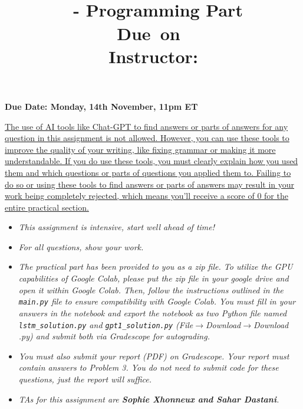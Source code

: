\documentclass[12pt]{article}
\title{
    \vspace{0in}
    \textmd{\textbf{\hmwkClass}}\\
    \hmwkTitle \ - Programming Part\\
    \normalsize\vspace{0.1in}\small{Due\ on\ \hmwkDueDate}\\
    \vspace{0.1in}\large{Instructor: \textit{\hmwkClassInstructor\\}} 
    \vspace{0in}
}
\begin{document}
\fancyhead{}
\fancyfoot{}


{\bf Due Date: Monday, 14th November, 11pm ET}

\vspace{-0.5cm}
\uline{The use of AI tools like Chat-GPT to find answers or parts of answers for any question in this assignment is not allowed. However, you can use these tools to improve the quality of your writing, like fixing grammar or making it more understandable. If you do use these tools, you must clearly explain how you used them and which questions or parts of questions you applied them to. Failing to do so or using these tools to find answers or parts of answers may result in your work being completely rejected, which means you'll receive a score of 0 for the entire practical section.}


\renewcommand{\labelitemi}{\textbullet}

\begin{itemize}
\item \emph{This assignment is intensive, start well ahead of time!}
\item \emph{For all questions, show your work.}
\item \emph{The practical part has been provided to you as a zip file. To utilize the GPU capabilities of Google Colab, please put the zip file in your google drive and open it within Google Colab. Then, follow the instructions outlined in the \texttt{main.py} file to ensure compatibility with Google Colab. You must fill in your answers in the notebook and export the notebook as two Python file named \texttt{lstm\_solution.py} and \texttt{gpt1\_solution.py} (File$\xrightarrow{}$Download$\xrightarrow{}$Download .py) and submit both via Gradescope for autograding.}
\item \emph{You must also submit your report (PDF) on Gradescope. Your report must contain answers to Problem 3. You do not need to submit code for these questions, just the report will suffice.}
\item \emph{TAs for this assignment are \textbf{Sophie Xhonneux and Sahar Dastani}.}
\end{itemize}
\vspace{0.2cm}
\end{document}
